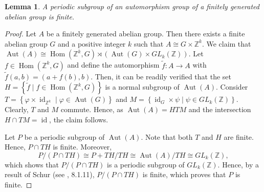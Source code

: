 \documentclass{amsart}
\newcommand{\id}{\operatorname{id}}
\newcommand{\Hom}{\operatorname{Hom}}
\newcommand{\Aut}{\operatorname{Aut}}
\newcommand{\Z}{\mathbb{Z}}
\newtheorem{lem}[thm]{Lemma}
\begin{document}
\begin{lem}\label{oversight}
    A periodic subgroup of an automorphism group of a finitely generated abelian group is finite.
\end{lem}
\begin{proof}
Let $A$ be a finitely generated abelian group.
Then there exists a finite abelian group $G$ and a positive integer $k$ 
such that $ A \cong G \times \Z^k$. 
We claim that $\Aut(A) \cong \Hom(\mathbb{Z}^k,G)\rtimes(\Aut(G) \times GL_k(\Z))$. 
Let $f\in \Hom(\mathbb{Z}^k,G)$ and define the automorphism $\tilde{f}: A \rightarrow A$
with $ \tilde{f}(a,b)=(a+f(b),b)$. 
Then, it can be readily verified that the set 
$H= \left\lbrace \tilde{f} \mid f \in \Hom(\mathbb{Z}^k,G)\right\rbrace$ is a normal subgroup of $\Aut(A)$. 
Consider $T = \left\lbrace \varphi \times \id_{\Z^k} \mid \varphi \in \Aut(G)\right\rbrace$ and $M = \left\lbrace \id_G \times \psi \mid \psi \in GL_k(\mathbb{Z})\right\rbrace$. 
Clearly, $T$ and $M$ commute. 
Hence, as $\Aut(A) = HTM$ and the intersection $H\cap TM = \id$, the claim follows. 

Let $P$ be a periodic subgroup of $\Aut(A)$. Note that both $T$ and $H$ are finite. Hence, $P\cap TH$ is finite. Moreover, 
$$P/(P\cap TH)\cong P+TH/TH \cong \Aut(A)/TH\cong GL_k(\mathbb{Z}),$$
which shows that $P/(P\cap TH)$ is a periodic subgroup of $GL_k(\mathbb{Z})$.
Hence, by a result of Schur (see \cite{robinson2}, 8.1.11), $P/ (P\cap TH)$ is finite, which proves that $P$ is finite.
\end{proof}
\end{document}
